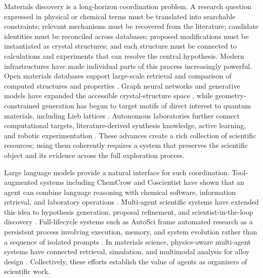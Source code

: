 \documentclass[11pt]{article}
\begin{document}
Materials discovery is a long-horizon coordination problem. A research question expressed in physical or chemical terms must be translated into searchable constraints; relevant mechanisms must be recovered from the literature; candidate identities must be reconciled across databases; proposed modifications must be instantiated as crystal structures; and each structure must be connected to calculations and experiments that can resolve the central hypothesis. Modern infrastructures have made individual parts of this process increasingly powerful. Open materials databases support large-scale retrieval and comparison of computed structures and properties \cite{jain2013materials,haastrup2018c2db}. Graph neural networks and generative models have expanded the accessible crystal-structure space \cite{merchant2023gnome,zeni2025mattergen}, while geometry-constrained generation has begun to target motifs of direct interest to quantum materials, including Lieb lattices \cite{okabe2026scigen}. Autonomous laboratories further connect computational targets, literature-derived synthesis knowledge, active learning, and robotic experimentation \cite{szymanski2023alab}. These advances create a rich collection of scientific resources; using them coherently requires a system that preserves the scientific object and its evidence across the full exploration process.

Large language models provide a natural interface for such coordination. Tool-augmented systems including ChemCrow and Coscientist have shown that an agent can combine language reasoning with chemical software, information retrieval, and laboratory operations \cite{bran2024chemcrow,boiko2023coscientist}. Multi-agent scientific systems have extended this idea to hypothesis generation, proposal refinement, and scientist-in-the-loop discovery \cite{gottweis2026coscientist}. Full-lifecycle systems such as AutoSci frame automated research as a persistent process involving execution, memory, and system evolution rather than a sequence of isolated prompts \cite{qian2026autosci}. In materials science, physics-aware multi-agent systems have connected retrieval, simulation, and multimodal analysis for alloy design \cite{ghafarollahi2024atomagents}. Collectively, these efforts establish the value of agents as organizers of scientific work.
\end{document}
